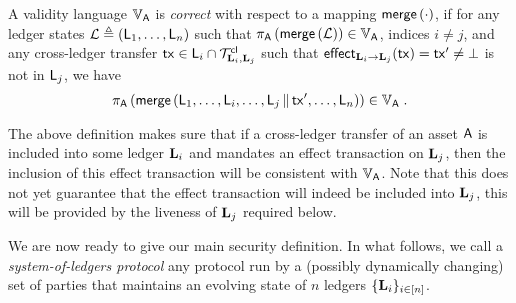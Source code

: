 \begin{definition}
  \label{def:correctness}
  A validity language $\ValLang_{\Asset}$ is \emph{correct}
  with respect to
      a mapping $\merge\left(\cdot\right)$,
if
  for any ledger states
  $\mathcal{L}\defeq(\LState_1, \ldots, \LState_n)$
  such that
  $
    \proj_{\Asset}\left(
      \merge\left(
       \mathcal{L}
      \right)
    \right)
    \in \ValLang_{\Asset}
  $,
indices $i \neq j$,
and any cross-ledger transfer %
$\tx\in\LState_i\cap\Trans_{\Ledger_i,\Ledger_j}^\cl$
such that  %
  $\eff{\Ledger_i}{\Ledger_j}(\tx)=\tx'\neq\noeffect$
  is not in $\LState_j$,
we have
$$
  \proj_{\Asset}\left(
    \merge\left(
      \LState_1, \ldots, \LState_i, \ldots,
      \LState_j\concat\tx',
      \ldots, \LState_n
      \right)
  \right)
\in \ValLang_{\Asset}
\; .
$$
\end{definition}

The above definition makes sure that if a cross-ledger transfer of an asset
$\Asset$  is included into
some ledger $\Ledger_i$ and mandates an effect transaction on $\Ledger_j$, then
the inclusion of this effect transaction will be consistent with
$\ValLang_\Asset$. Note that this does not yet guarantee that the effect
transaction will indeed be included into $\Ledger_j$, this will be provided by
the liveness of $\Ledger_j$ required below.


We are now ready to give our main security definition.
In what follows, we call a \emph{system-of-ledgers protocol} any protocol run by a
(possibly dynamically changing) set of parties that maintains an evolving state
of $n$ ledgers $\{\Ledger_i\}_{i\in[n]}$.

